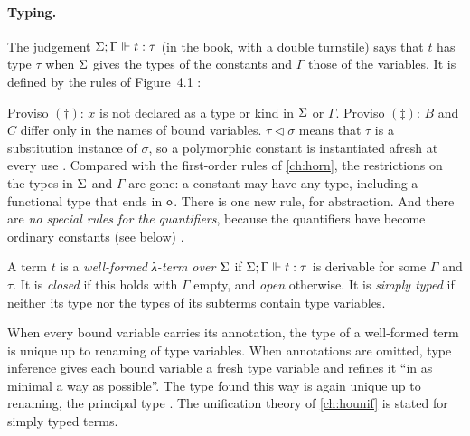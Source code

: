 \paragraph{Typing.} The judgement $\Sigma;\Gamma\Vdash t:\tau$ (in the book, with a double turnstile) says
that $t$ has type $\tau$ when $\Sigma$ gives the types of the constants and $\Gamma$ those of the
variables. It is defined by the rules of Figure~4.1 :
Proviso $(\dagger)$: $x$ is not declared as a type or kind in $\Sigma$ or $\Gamma$. Proviso $(\ddagger)$:
$B$ and $C$ differ only in the names of bound variables. $\tau\triangleleft\sigma$ means that $\tau$ is a
substitution instance of $\sigma$, so a polymorphic constant is instantiated afresh at every use
. Compared with the first-order rules of \cref{ch:horn}, the restrictions on the types in
$\Sigma$ and $\Gamma$ are gone: a constant may have any type, including a functional type that ends in
$\mathsf{o}$. There is one new rule, for abstraction. And there are \emph{no special rules for the
quantifiers}, because the quantifiers have become ordinary constants (see below) .

\begin{definition}\label{def:lambda-wf}
A term $t$ is a \emph{well-formed λ-term over $\Sigma$} if $\Sigma;\Gamma\Vdash t:\tau$ is derivable for
some $\Gamma$ and $\tau$. It is \emph{closed} if this holds with $\Gamma$ empty, and \emph{open}
otherwise. It is \emph{simply typed} if neither its type nor the types of its subterms contain type
variables.
\end{definition}

When every bound variable carries its annotation, the type of a well-formed term is unique up to
renaming of type variables. When annotations are omitted, type inference gives each bound variable a
fresh type variable and refines it \enquote{in as minimal a way as possible}. The type found this
way is again unique up to renaming, the principal type . The unification theory of
\cref{ch:hounif} is stated for simply typed terms.

